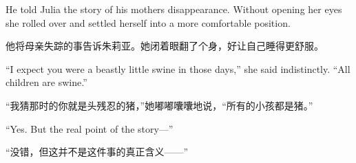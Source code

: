 \begin{paracol}{2}
\switchcolumn*

He told Julia the story of his mother\textquotesingle s disappearance.
Without opening her eyes she rolled over and settled herself into a more
comfortable position.

\switchcolumn

他将母亲失踪的事告诉朱莉亚。她闭着眼翻了个身，好让自己睡得更舒服。

\switchcolumn*

``I expect you were a beastly little swine in those days,'' she said
indistinctly. ``All children are swine.''

\switchcolumn

``我猜那时的你就是头残忍的猪，''她嘟嘟囔囔地说，``所有的小孩都是猪。''

\switchcolumn*

``Yes. But the real point of the story---''

\switchcolumn

``没错，但这并不是这件事的真正含义——''

\switchcolumn*


\end{paracol}
